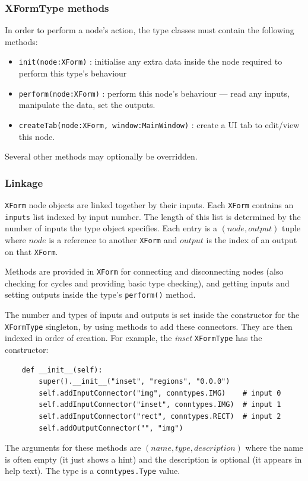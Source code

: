 \subsubsection{XFormType methods}
In order to perform a node's action, the type classes must contain
the following methods:
\begin{itemize}
\item \texttt{init(node:XForm)} : initialise any extra data inside
the node required to perform this type's behaviour
\item \texttt{perform(node:XForm)} : perform this node's behaviour ---
read any inputs, manipulate the data, set the outputs.
\item \texttt{createTab(node:XForm, window:MainWindow)} : create a UI tab to edit/view this node.
\end{itemize}
Several other methods may optionally be overridden.

\subsubsection{Linkage}
\label{linkage}
\texttt{XForm} node objects are linked together by their inputs.
Each \texttt{XForm} contains an \texttt{inputs} list indexed by
input number. The length of this list is determined by the number
of inputs the type object specifies. Each entry is a $(node,output)$
tuple where $node$ is a reference to another \texttt{XForm} and
$output$ is the index of an output on that \texttt{XForm}.

Methods are provided in \texttt{XForm} for connecting and disconnecting nodes
(also checking for cycles and providing basic type checking), and getting
inputs and setting outputs inside the type's \texttt{perform()} method.

The number and types of inputs and outputs is set inside the 
constructor for the \texttt{XFormType} singleton, by using methods
to add these connectors. They are then indexed in order of creation.
For example, the \emph{inset} \texttt{XFormType} has the constructor:
\begin{lstlisting}
    def __init__(self):
        super().__init__("inset", "regions", "0.0.0")
        self.addInputConnector("img", conntypes.IMG)    # input 0
        self.addInputConnector("inset", conntypes.IMG)  # input 1
        self.addInputConnector("rect", conntypes.RECT)  # input 2
        self.addOutputConnector("", "img")
\end{lstlisting}
The arguments for these methods are $(name,type,description)$ where the name
is often empty (it just shows a hint) and the description is optional (it appears
in help text). The type is a \texttt{conntypes.Type} value.

